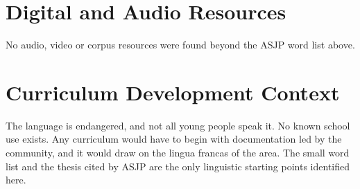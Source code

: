 \documentclass[12pt]{article}
\begin{document}
\section{Digital and Audio Resources}
No audio, video or corpus resources were found beyond the ASJP word list above.

\section{Curriculum Development Context}
The language is endangered, and not all young people speak it. No known school use exists. Any curriculum would have to begin with documentation led by the community, and it would draw on the lingua francas of the area. The small word list and the thesis cited by ASJP are the only linguistic starting points identified here.
\end{document}
